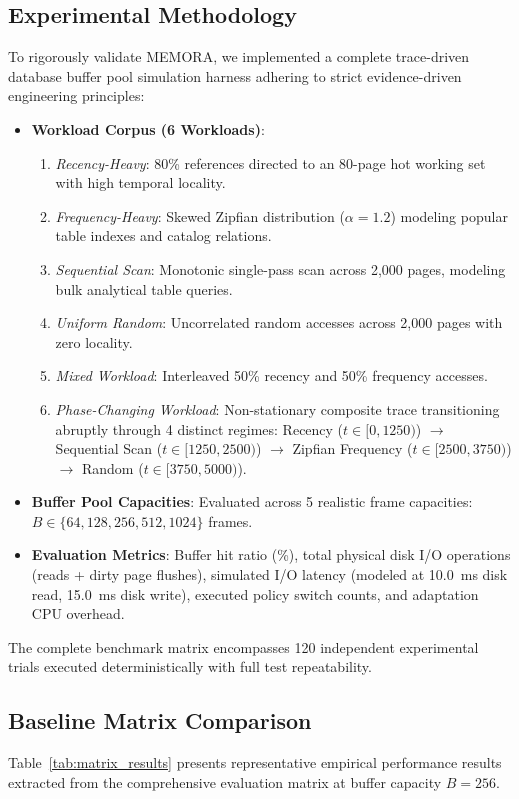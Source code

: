 \documentclass[conference]{IEEEtran}
\begin{document}
\subsection{Experimental Methodology}
To rigorously validate MEMORA, we implemented a complete trace-driven database buffer pool simulation harness adhering to strict evidence-driven engineering principles:
\begin{itemize}
    \item \textbf{Workload Corpus (6 Workloads)}:
    \begin{enumerate}
        \item \textit{Recency-Heavy}: 80\% references directed to an 80-page hot working set with high temporal locality.
        \item \textit{Frequency-Heavy}: Skewed Zipfian distribution ($\alpha = 1.2$) modeling popular table indexes and catalog relations.
        \item \textit{Sequential Scan}: Monotonic single-pass scan across 2,000 pages, modeling bulk analytical table queries.
        \item \textit{Uniform Random}: Uncorrelated random accesses across 2,000 pages with zero locality.
        \item \textit{Mixed Workload}: Interleaved 50\% recency and 50\% frequency accesses.
        \item \textit{Phase-Changing Workload}: Non-stationary composite trace transitioning abruptly through 4 distinct regimes: Recency ($t \in [0, 1250)$) $\to$ Sequential Scan ($t \in [1250, 2500)$) $\to$ Zipfian Frequency ($t \in [2500, 3750)$) $\to$ Random ($t \in [3750, 5000)$).
    \end{enumerate}
    \item \textbf{Buffer Pool Capacities}: Evaluated across 5 realistic frame capacities: $B \in \{64, 128, 256, 512, 1024\}$ frames.
    \item \textbf{Evaluation Metrics}: Buffer hit ratio (\%), total physical disk I/O operations (reads + dirty page flushes), simulated I/O latency (modeled at 10.0~ms disk read, 15.0~ms disk write), executed policy switch counts, and adaptation CPU overhead.
\end{itemize}
The complete benchmark matrix encompasses 120 independent experimental trials executed deterministically with full test repeatability.

\subsection{Baseline Matrix Comparison}
Table~\ref{tab:matrix_results} presents representative empirical performance results extracted from the comprehensive evaluation matrix at buffer capacity $B=256$.
\end{document}
